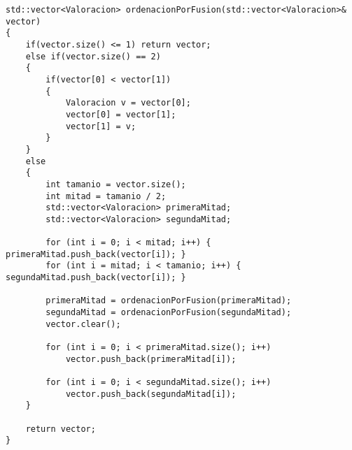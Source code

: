 \lstset{language=C++, texcl=true}
\begin{lstlisting}[frame=single]
std::vector<Valoracion> ordenacionPorFusion(std::vector<Valoracion>& vector)
{
    if(vector.size() <= 1) return vector;
    else if(vector.size() == 2)
    {
        if(vector[0] < vector[1])
        {
            Valoracion v = vector[0];
            vector[0] = vector[1];
            vector[1] = v;
        }
    }
    else
    {
        int tamanio = vector.size();
        int mitad = tamanio / 2;
        std::vector<Valoracion> primeraMitad;
        std::vector<Valoracion> segundaMitad;
        
        for (int i = 0; i < mitad; i++) { primeraMitad.push_back(vector[i]); }
        for (int i = mitad; i < tamanio; i++) { segundaMitad.push_back(vector[i]); }
        
        primeraMitad = ordenacionPorFusion(primeraMitad);
        segundaMitad = ordenacionPorFusion(segundaMitad);
        vector.clear();
        
        for (int i = 0; i < primeraMitad.size(); i++)
            vector.push_back(primeraMitad[i]);
        
        for (int i = 0; i < segundaMitad.size(); i++)
            vector.push_back(segundaMitad[i]);
    }
    
    return vector;
}
\end{lstlisting}
